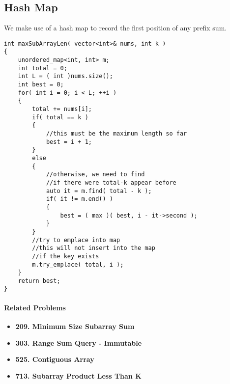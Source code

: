 \subsection{Hash Map}
We make use of a hash map to record the first position of any prefix sum.

\setcounter{lstlisting}{0}
\begin{lstlisting}[style=customc, caption={Hash Map}]
int maxSubArrayLen( vector<int>& nums, int k )
{
    unordered_map<int, int> m;
    int total = 0;
    int L = ( int )nums.size();
    int best = 0;
    for( int i = 0; i < L; ++i )
    {
        total += nums[i];
        if( total == k )
        {
            //this must be the maximum length so far
            best = i + 1;
        }
        else
        {
            //otherwise, we need to find
            //if there were total-k appear before
            auto it = m.find( total - k );
            if( it != m.end() )
            {
                best = ( max )( best, i - it->second );
            }
        }
        //try to emplace into map
        //this will not insert into the map
        //if the key exists
        m.try_emplace( total, i );
    }
    return best;
}
\end{lstlisting}

\paragraph{Related Problems}
\begin{itemize}
\item \textbf{209. Minimum Size Subarray Sum}
\item \textbf{303. Range Sum Query - Immutable}
\item \textbf{525. Contiguous Array}
\item \textbf{713. Subarray Product Less Than K}
\end{itemize}